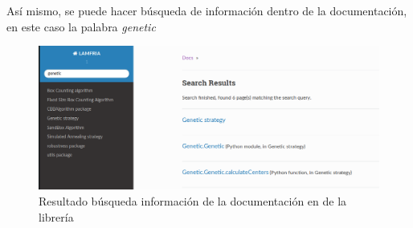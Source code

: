Así mismo, se puede hacer búsqueda de información dentro de la documentación, en este caso la palabra \textit{genetic}

\begin{figure}[H]
    \centering
    \includegraphics[scale=0.45]{Capitulo7Libreria/imagenes/lamfriaC.png}
    \caption{Resultado búsqueda información de la documentación en de la librería}
    \label{fig:lamfriaC}
\end{figure}